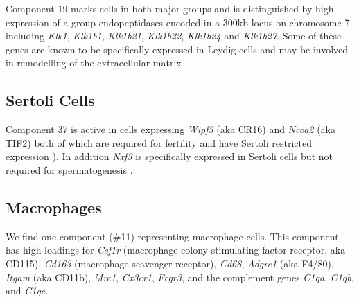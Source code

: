 Component 19 marks cells in both major groups and is distinguished by high expression of a group endopeptidases encoded in a 300kb locus on chromosome 7 including \textit{Klk1}, \textit{Klk1b1}, \textit{Klk1b21}, \textit{Klk1b22}, \textit{Klk1b24} and \textit{Klk1b27}. Some of these genes are known to be specifically expressed in Leydig cells and may be involved in remodelling of the extracellular matrix \parencite{Sanz2013RiboTag, Matsui2000Cloning, Matsui2001Mouse, Matsui2005Characterization}.

\subsection{Sertoli Cells}

Component 37 is active in cells expressing \textit{Wipf3} (aka CR16) and \textit{Ncoa2} (aka TIF2) both of which are required for fertility and have Sertoli restricted expression \cite{Suetsugu2007Malespecific, Gehin2002Function}). In addition \textit{Nxf3} is specifically expressed in Sertoli cells but not required for spermatogenesis \cite{Zhou2011Nxf3}.



\subsection{Macrophages}
We find one component (\#11) representing macrophage cells. This component has high loadings for \textit{Csf1r} (macrophage colony-stimulating factor receptor, aka CD115), \textit{Cd163} (macrophage scavenger receptor), \textit{Cd68}, \textit{Adgre1} (aka F4/80), \textit{Itgam} (aka CD11b), \textit{Mrc1}, \textit{Cx3cr1}, \textit{Fcgr3}, and the complement genes \textit{C1qa}, \textit{C1qb}, and \textit{C1qc}. \parencite{Mossadegh-Keller2017Developmental, Fabriek2005macrophage, Sasmono2012Generation}

